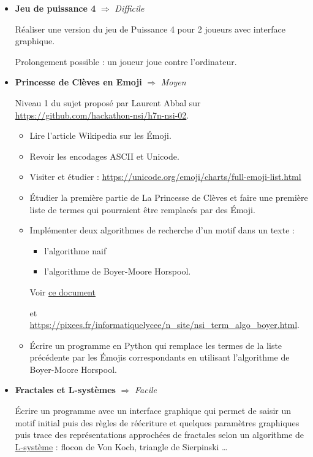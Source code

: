 \documentclass[a4paper, french, 12pt]{article}  %
\newcounter{act}
\newcounter{thme}
\newcounter{prop}
\newcounter{alg}
\begin{document}
\begin{itemize}
\item \textbf{Jeu de puissance 4} $\Rightarrow$ \textit{Difficile}

\medskip

Réaliser une version du jeu de Puissance 4 pour 2 joueurs avec interface graphique.


Prolongement possible : un joueur joue contre l'ordinateur.  


\bigskip 


\item \textbf{Princesse de Clèves en Emoji}  $\Rightarrow$ \textit{Moyen}

Niveau 1 du sujet proposé par Laurent Abbal sur \url{https://github.com/hackathon-nsi/h7n-nsi-02}.

\begin{itemize}
\item     Lire l'article Wikipedia sur les Émoji.
 \item   Revoir les encodages ASCII et Unicode.
  \item   Visiter et étudier : \url{https://unicode.org/emoji/charts/full-emoji-list.html}
   \item  Étudier la première partie de La Princesse de Clèves et faire une première liste de termes qui pourraient être remplacés par des Émoji.
   \item Implémenter deux algorithmes de recherche d'un motif dans un texte :
   	\begin{itemize}
   		\item l'algorithme naif
   		\item l'algorithme de Boyer-Moore Horspool.  
\end{itemize}   	 
Voir \href{https://cache.media.eduscol.education.fr/file/NSI/63/5/RA20_NSI_G_T_boyer-moore_1298635.pdf}{ce document}

et \url{https://pixees.fr/informatiquelycee/n_site/nsi_term_algo_boyer.html}.
   \item  Écrire un programme en Python qui remplace les termes de la liste précédente par les Émojis correspondants en utilisant l'algorithme de Boyer-Moore Horspool.
  \end{itemize}



\bigskip

\item \textbf{Fractales et L-systèmes} $\Rightarrow$ \textit{Facile}

Écrire un programme avec un interface graphique qui permet de saisir un motif initial puis des règles de réécriture et quelques paramètres graphiques puis  trace des représentations approchées de fractales selon un algorithme de \href{https://fr.wikipedia.org/wiki/L-Syst\%C3\%A8me}{L-système} : flocon de Von Koch, triangle de Sierpinski \ldots 


\end{itemize}
\end{document}
